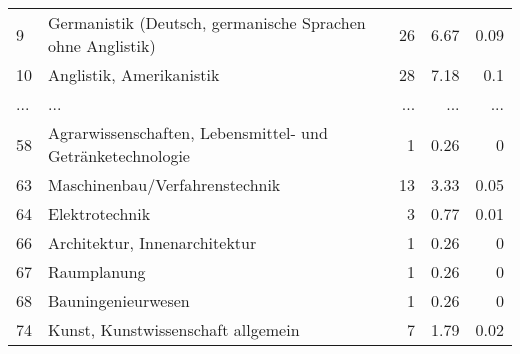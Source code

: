 \begin{longtable}{lXrrr}
        9 & \multicolumn{1}{X}{Germanistik (Deutsch, germanische Sprachen ohne Anglistik)} & %
          \num{26} &
          \num[round-mode=places,round-precision=2]{6.67} &
          \num[round-mode=places,round-precision=2]{0.09} \\
        10 & \multicolumn{1}{X}{Anglistik, Amerikanistik} & %
          \num{28} &
          \num[round-mode=places,round-precision=2]{7.18} &
          \num[round-mode=places,round-precision=2]{0.1} \\
       ... & ... & ... & ... & ... \\
        58 & \multicolumn{1}{X}{Agrarwissenschaften, Lebensmittel- und Getränketechnologie} & %
          \num{1} &
          \num[round-mode=places,round-precision=2]{0.26} &
          \num[round-mode=places,round-precision=2]{0} \\

        63 & \multicolumn{1}{X}{Maschinenbau/Verfahrenstechnik} & %
          \num{13} &
          \num[round-mode=places,round-precision=2]{3.33} &
          \num[round-mode=places,round-precision=2]{0.05} \\

        64 & \multicolumn{1}{X}{Elektrotechnik} & %
          \num{3} &
          \num[round-mode=places,round-precision=2]{0.77} &
          \num[round-mode=places,round-precision=2]{0.01} \\

        66 & \multicolumn{1}{X}{Architektur, Innenarchitektur} & %
          \num{1} &
          \num[round-mode=places,round-precision=2]{0.26} &
          \num[round-mode=places,round-precision=2]{0} \\

        67 & \multicolumn{1}{X}{Raumplanung} & %
          \num{1} &
          \num[round-mode=places,round-precision=2]{0.26} &
          \num[round-mode=places,round-precision=2]{0} \\

        68 & \multicolumn{1}{X}{Bauningenieurwesen} & %
          \num{1} &
          \num[round-mode=places,round-precision=2]{0.26} &
          \num[round-mode=places,round-precision=2]{0} \\

        74 & \multicolumn{1}{X}{Kunst, Kunstwissenschaft allgemein} & %
          \num{7} &
          \num[round-mode=places,round-precision=2]{1.79} &
          \num[round-mode=places,round-precision=2]{0.02} \\


\end{longtable}
